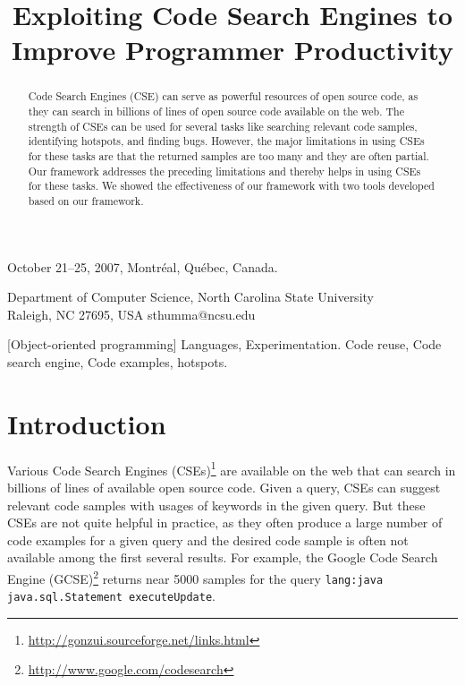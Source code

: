 \documentclass{sigplanconf}
\newcommand{\CodeIn}[1]{{\small\texttt{#1}}}
\newcommand{\Comment}[1]{}
\begin{document}
\authorpermission
{} {October 21--25, 2007, Montr{\'e}al, Qu{\'e}bec, Canada.}


\title{Exploiting Code Search Engines to Improve Programmer Productivity}

           {Department of Computer Science, North Carolina State University\\Raleigh, NC 27695, USA}
           {sthumma@ncsu.edu}

\maketitle

\begin{abstract}
Code Search Engines (CSE) can serve as powerful resources of open
source code, as they can search in billions of lines of open source
code available on the web. The strength of CSEs can be used for
several tasks like searching relevant code samples, identifying
hotspots, and finding bugs. However, the major limitations in using
CSEs for these tasks are that the returned samples are too many and
they are often partial. Our framework addresses the preceding
limitations and thereby helps in using CSEs for these tasks. We
showed the effectiveness of our framework with two tools developed
based on our framework.
\end{abstract}

[Object-oriented programming]
\terms 
Languages, Experimentation.
\keywords
Code reuse, Code search engine, Code examples, hotspots.

\section{Introduction}
Various Code Search Engines (CSEs)\footnote{\url{http://gonzui.sourceforge.net/links.html}}
are available on the web that can search in billions of lines of available open source code. 
\Comment{Some of these CSEs like Google, Koders, DocJar, Codease, and Krugle are non-academic. SPARS-J and 
Sourcerer are two of the few academic code search engines.} Given a query, CSEs 
can suggest relevant code samples with usages of keywords in the given query. But these CSEs
are not quite helpful in practice, as they often produce a large number of code
examples for a given query and the desired code sample is often not available 
among the first several results. For example, the Google Code Search Engine
(GCSE)\footnote{\url{http://www.google.com/codesearch}} 
returns near 5000 samples for the query \CodeIn{lang:java
java.sql.Statement executeUpdate}.\Comment{; this query can be used to
extract information regarding the usage of Application Programming Interface (API) 
\CodeIn{executeUpdate} of \CodeIn{java.sql.Statement} class of JDBC.}
\end{document}
